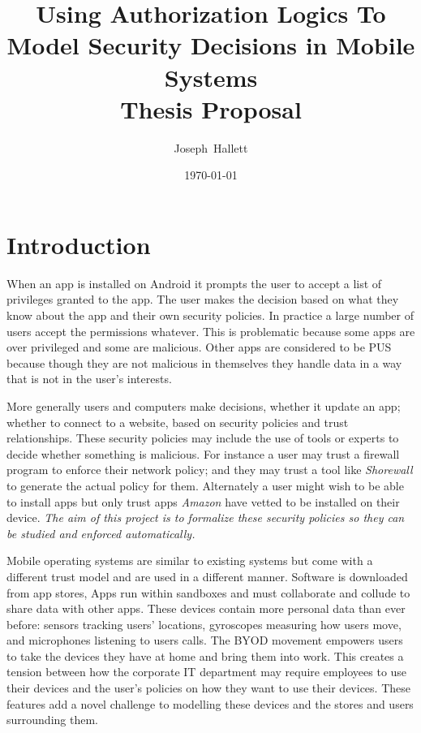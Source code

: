 \documentclass[a4paper,12pt,sfsidenotes]{tufte-book}
\title{Using Authorization Logics To Model Security Decisions in Mobile
  Systems\\\vspace{2em}Thesis Proposal}
\author{Joseph~Hallett}
\date\today
\begin{document}
\maketitle
\setcounter{tocdepth}{3}
\tableofcontents
\pagebreak

\section{Introduction}

When an app is installed on Android it prompts the user to accept a list of
privileges granted to the app.  The user makes the decision based on what they
know about the app and their own security policies.  In practice a large number
of users accept the permissions whatever.  This is problematic because some apps
are over privileged\cite{Felt:2011kj} and some are malicious\cite{Zhou:2012cf}.
Other apps are considered to be \ac{PUS} because though they are not malicious
in themselves they handle data in a way that is not in the user's interests.

More generally users and computers make decisions, whether it update an app;
whether to connect to a website, based on security policies and trust
relationships.  These security policies may include the use of tools or experts
to decide whether something is malicious.  For instance a user may trust a
firewall program to enforce their network policy; and they may trust a tool like
\emph{Shorewall} to generate the actual policy for them.  Alternately a user
might wish to be able to install apps but only trust apps \emph{Amazon} have
vetted to be installed on their device.  \emph{The aim of this project is to
  formalize these security policies so they can be studied and enforced
  automatically.}

Mobile operating systems are similar to existing systems but come with a
different trust model and are used in a different manner.  Software is
downloaded from app stores, Apps run within sandboxes and must collaborate and
collude to share data with other apps. These devices contain more personal data
than ever before: sensors tracking users' locations,  gyroscopes measuring how
users move, and microphones listening to users calls.  The \ac{BYOD} movement
empowers users to take the devices they have at home and bring them into work.
This creates a tension between how the corporate IT department may require
employees to use their devices and the user's policies on how they want to use
their devices.  These features add a novel challenge to modelling these devices
and the stores and users surrounding them.  
\end{document}
